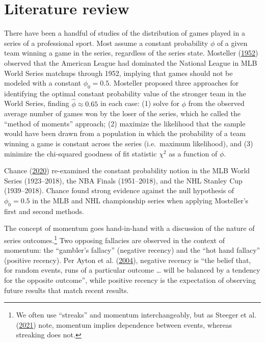\documentclass{article}
\begin{document}
\hypertarget{literature-review}{%
\section{Literature review}\label{literature-review}}

There have been a handful of studies of the distribution of games played
in a series of a professional sport. Most assume a constant probability
\(\phi\) of a given team winning a game in the series, regardless of the
series state. Mosteller (\protect\hyperlink{ref-mosteller1952}{1952})
observed that the American League had dominated the National League in
MLB World Series matchups through 1952, implying that games should not
be modeled with a constant \(\phi_0 = 0.5\). Mosteller proposed three
approaches for identifying the optimal constant probability value of the
stronger team in the World Series, finding \(\hat{\phi} \approx 0.65\)
in each case: (1) solve for \(\phi\) from the observed average number of
games won by the loser of the series, which he called the ``method of
moments'' approach; (2) maximize the likelihood that the sample would
have been drawn from a population in which the probability of a team
winning a game is constant across the series (i.e.~maximum likelihood),
and (3) minimize the chi-squared goodness of fit statistic \(\chi^2\) as
a function of \(\phi\).

Chance (\protect\hyperlink{ref-chance2020}{2020}) re-examined the
constant probability notion in the MLB World Series (1923--2018), the
NBA Finals (1951--2018), and the NHL Stanley Cup (1939--2018). Chance
found strong evidence against the null hypothesis of \(\phi_0 = 0.5\) in
the MLB and NHL championship series when applying Mosteller's first and
second methods.

The concept of momentum goes hand-in-hand with a discussion of the
nature of series outcomes.\footnote{We often use ``streaks'' and
  momentum interchangeably, but as Steeger et al.
  (\protect\hyperlink{ref-steeger2021}{2021}) note, momentum implies
  dependence between events, whereas streaking does not.} Two opposing
fallacies are observed in the context of momentum: the ``gambler's
fallacy'' (negative recency) and the ``hot hand fallacy'' (positive
recency). Per Ayton et al. (\protect\hyperlink{ref-ayton2004}{2004}),
negative recency is ``the belief that, for random events, runs of a
particular outcome \ldots{} will be balanced by a tendency for the
opposite outcome'', while positive recency is the expectation of
observing future results that match recent results.
\end{document}
